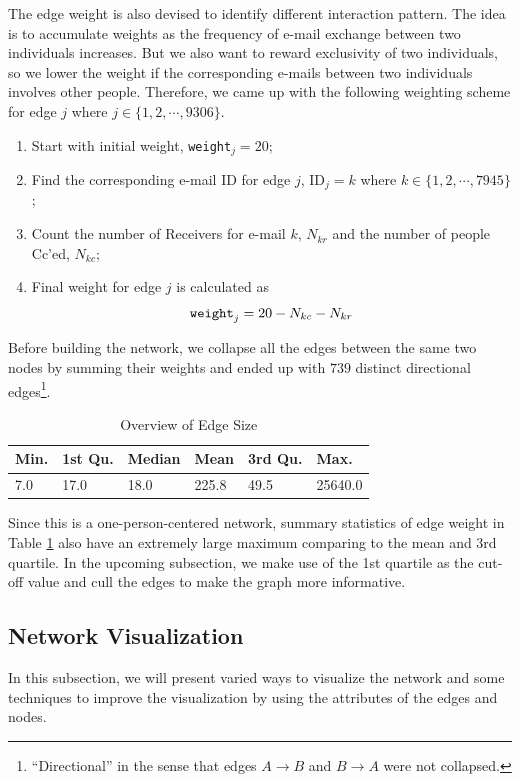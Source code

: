 \documentclass[11pt]{article}
\begin{document}
The edge weight is also devised to identify different interaction pattern. The idea is to accumulate weights as the frequency of e-mail exchange between two individuals increases. But we also want to reward exclusivity of two individuals, so we lower the weight if the corresponding e-mails between two individuals involves other people. Therefore, we came up with the following weighting scheme for edge $j$ where $j \in \{1,2 , \cdots, 9306\}$.\begin{enumerate}
\item Start with initial weight, \verb+weight+$_j = 20$;
\item Find the corresponding e-mail ID for edge $j$, ID$_j = k$  where $k \in \{1, 2, \cdots, 7945\}$;
\item Count the number of Receivers for e-mail $k$, $N_{kr}$ and the number of people Cc'ed, $N_{kc}$;
\item Final weight for edge $j$ is calculated as
\begin{equation}
\verb+weight+_j = 20 - N_{kc} - N_{kr}
\end{equation}
\end{enumerate}
Before building the network, we collapse all the edges between the same two nodes by summing their weights and ended up with $739$ distinct directional edges\footnote{``Directional'' in the sense that edges $A \rightarrow B$ and $B \rightarrow A$ were not collapsed. }.
\begin{table}[ht]
\caption{Overview of Edge Size}
\label{tab:edge_size}
\centering
\begin{tabular}{llllll}
Min. &1st Qu. & Median&    Mean& 3rd Qu.  &  Max. \\ \hline
   7.0    &17.0  &  18.0 &  225.8   & 49.5&25640.0 
 \end{tabular}
\end{table} 

Since this is a one-person-centered network, summary statistics of edge weight in Table \ref{tab:edge_size} also have an extremely large maximum comparing to the mean and 3rd quartile. In the upcoming subsection, we make use of the 1st quartile as the cut-off value and cull the edges to make the graph more informative.

\subsection{Network Visualization} \label{sna_nw}
In this subsection, we will present varied ways to visualize the network and some techniques to improve the visualization by using the attributes of the edges and nodes.
\end{document}
